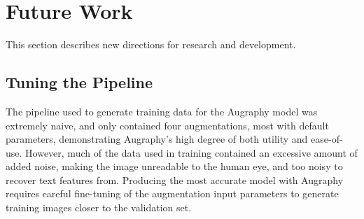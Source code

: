 \documentclass[runningheads]{llncs}
\newcommand{\ocrCleanLevenshteinDistance}{\emph{TODO}}
\newcommand{\ocrAugraphyAverageLevenshteinDistance}{\emph{TODO}}
\begin{document}



\section{Future Work}
This section describes new directions for research and development.

\subsection{Tuning the Pipeline}
The pipeline used to generate training data for the Augraphy model was extremely naive, and only contained four augmentations, most with default parameters, demonstrating Augraphy's high degree of both utility and ease-of-use.
However, much of the data used in training contained an excessive amount of added noise, making the image unreadable to the human eye, and too noisy to recover text features from.
Producing the most accurate model with Augraphy requires careful fine-tuning of the augmentation input parameters to generate training images closer to the validation set.
\end{document}
